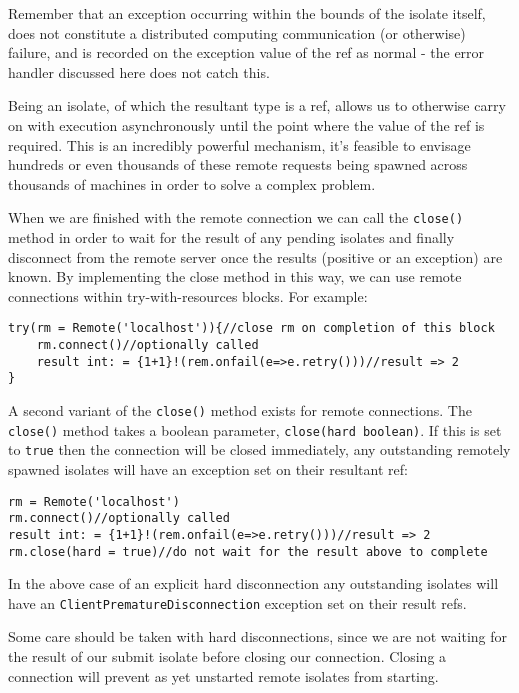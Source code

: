 \documentclass[conc-doc]{subfiles}
\begin{document}
Remember that an exception occurring within the bounds of the isolate itself, does not constitute a distributed computing communication (or otherwise) failure, and is recorded on the exception value of the ref as normal - the error handler discussed here does not catch this.

Being an isolate, of which the resultant type is a ref, allows us to otherwise carry on with execution asynchronously until the point where the value of the ref is required. This is an incredibly powerful mechanism, it's feasible to envisage hundreds or even thousands of these remote requests being spawned across thousands of machines in order to solve a complex problem.

When we are finished with the remote connection we can call the \lstinline{close()} method in order to wait for the result of any pending isolates and finally disconnect from the remote server once the results (positive or an exception) are known. By implementing the close method in this way, we can use remote connections within try-with-resources blocks. For example:

\begin{lstlisting}
try(rm = Remote('localhost')){//close rm on completion of this block
	rm.connect()//optionally called
	result int: = {1+1}!(rem.onfail(e=>e.retry()))//result => 2
}
\end{lstlisting}

A second variant of the \lstinline{close()} method exists for remote connections. The \lstinline{close()} method takes a boolean parameter, \lstinline{close(hard boolean)}. If this is set to \lstinline{true} then the connection will be closed immediately, any outstanding remotely spawned isolates will have an exception set on their resultant ref:

\begin{lstlisting}
rm = Remote('localhost')
rm.connect()//optionally called
result int: = {1+1}!(rem.onfail(e=>e.retry()))//result => 2
rm.close(hard = true)//do not wait for the result above to complete
\end{lstlisting}

In the above case of an explicit hard disconnection any outstanding isolates will have an \lstinline{ClientPrematureDisconnection} exception set on their result refs.

Some care should be taken with hard disconnections, since we are not waiting for the result of our submit isolate before closing our connection. Closing a connection will prevent as yet unstarted remote isolates from starting.
\end{document}
